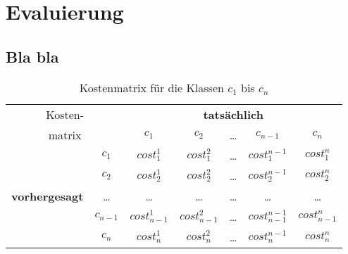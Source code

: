 \chapter{Evaluierung}



\section{Bla bla}

\begin{table}[ht]
	\centering
	\begin{tabular}{|c|c||c|c|c|c|c|}
		\hline
		\multicolumn{2}{|c||}{Kosten-} & \multicolumn{5}{c|}{\textbf{tatsächlich}} \\ 
		\cline{3-7}
		\multicolumn{2}{|c||}{matrix} & $c_1$ & $c_2$ & \ldots & $c_{n-1}$ & $c_n$ \\ 
		\hline
		\hline
		 & $c_1$ & $cost_1^1$ & $cost_1^2$ & \ldots & $cost_1^{n-1}$ & $cost_1^n$ \\ 
		\cline{2-7}
		 & $c_2$ & $cost_2^1$ & $cost_2^2$ & \ldots & $cost_2^{n-1}$ & $cost_2^n$ \\ 
		\cline{2-7}
		\textbf{vorhergesagt} & \ldots &  \ldots &  \ldots &  \ldots &  \ldots & 
		\ldots \\
		\cline{2-7}
 		& $c_{n-1}$ & $cost_{n-1}^1$ & $cost_{n-1}^2$ &  \ldots & $cost_{n-1}^{n-1}$ &
 		$cost_{n-1}^n$ \\
		\cline{2-7}
 		& $c_n$ & $cost_n^1$ & $cost_n^2$ &  \ldots & $cost_n^{n-1}$ & $cost_n^n$ \\ 
		\hline
	\end{tabular}
	\caption{Kostenmatrix für die Klassen $c_1$ bis $c_n$}
	\label{tab:Kostenmatrix}
\end{table}

